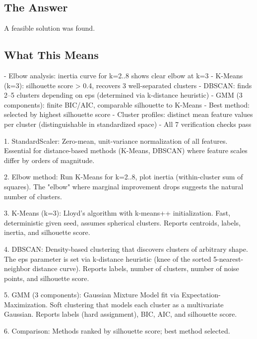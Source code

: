 \documentclass[11pt, a4paper]{article}
\begin{document}
\subsection{The Answer}

\begin{polyainsight}[title={Bottom Line}]
A feasible solution was found.
\end{polyainsight}

\subsection{What This Means}

- Elbow analysis: inertia curve for k=2..8 shows clear elbow at k=3
- K-Means (k=3): silhouette score > 0.4, recovers 3 well-separated clusters
- DBSCAN: finds 2--5 clusters depending on eps (determined via k-distance heuristic)
- GMM (3 components): finite BIC/AIC, comparable silhouette to K-Means
- Best method: selected by highest silhouette score
- Cluster profiles: distinct mean feature values per cluster (distinguishable in standardized space)
- All 7 verification checks pass

1. StandardScaler: Zero-mean, unit-variance normalization of all features. Essential for distance-based methods (K-Means, DBSCAN) where feature scales differ by orders of magnitude.

2. Elbow method: Run K-Means for k=2..8, plot inertia (within-cluster sum of squares). The "elbow" where marginal improvement drops suggests the natural number of clusters.

3. K-Means (k=3): Lloyd's algorithm with k-means++ initialization. Fast, deterministic given seed, assumes spherical clusters. Reports centroids, labels, inertia, and silhouette score.

4. DBSCAN: Density-based clustering that discovers clusters of arbitrary shape. The eps parameter is set via k-distance heuristic (knee of the sorted 5-nearest-neighbor distance curve). Reports labels, number of clusters, number of noise points, and silhouette score.

5. GMM (3 components): Gaussian Mixture Model fit via Expectation-Maximization. Soft clustering that models each cluster as a multivariate Gaussian. Reports labels (hard assignment), BIC, AIC, and silhouette score.

6. Comparison: Methods ranked by silhouette score; best method selected.
\end{document}
